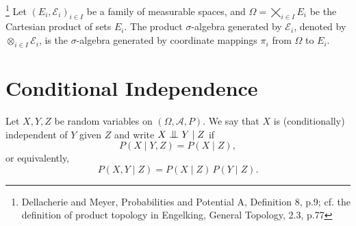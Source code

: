 \begin{definition}
\footnote{Dellacherie and Meyer, Probabilities and Potential A, Definition 8, 
p.9; cf. the definition of product topology in Engelking, General Topology,
2.3, p.77}
Let $(E_i,\mathcal{E}_i)_{i\in I}$ be a family of measurable spaces, and 
$\Omega=\bigtimes_{i\in I} E_i$ be the Cartesian product of sets $E_i$.
The product $\sigma$-algebra generated by $\mathcal{E}_i$, denoted by
$\otimes_{i\in I} \mathcal{E}_i$, is the $\sigma$-algebra generated by 
coordinate mappings $\pi_i$ from $\Omega$ to $E_i$. 
\end{definition}

\section{Conditional Independence}

\begin{definition}
Let $X,Y,Z$ be random variables on $(\Omega,\mathcal{A},P)$. We say that $X$ is
(conditionally) independent of $Y$ given $Z$ and write $X\bigCI Y \mid Z$ if
\[
  P(X \mid Y,Z) = P(X \mid Z),
\]
or equivalently,
\[
  P(X,Y \mid Z) = P(X \mid Z) \, P(Y \mid Z).
\]
\end{definition}

